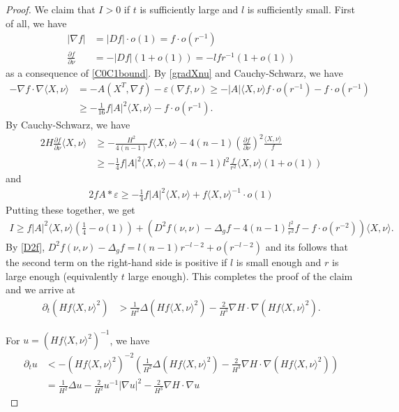 \documentclass[10pt,a4paper]{amsart}
\newcommand{\lt}{\left}
\newcommand{\na}{\nabla}
\newcommand{\pl}{\partial}
\newcommand{\rt}{\right}
\begin{document}
\begin{proof}
We claim that $I > 0$ if $t$ is sufficiently large and $l$ is sufficiently small. First of all, we have 
\begin{align*}
|\na f| &= |Df| \cdot o(1) = f \cdot o(r^{-1}) \\
\frac{\pl f}{\pl\nu} &= - |Df| (1 + o(1)) = - lf r^{-1} (1 + o(1))
\end{align*}
as a consequence of \eqref{C0C1bound}.
By \eqref{gradXnu} and Cauchy-Schwarz, we have
\begin{align*}
- \na f \cdot \na \langle X,\nu \rangle &= - A(X^T,\na f) - \varepsilon (\na f,\nu) \ge  - |A|\langle X,\nu \rangle f \cdot o(r^{-1}) - f \cdot o(r^{-1}) \\
&\ge -\frac{1}{16} f |A|^2 \langle X,\nu \rangle  - f \cdot o(r^{-1}).
\end{align*}
By Cauchy-Schwarz, we have
\begin{align*}
2H \frac{\pl f}{\pl\nu} \langle X,\nu \rangle &\ge - \frac{H^2}{4(n-1)} f \langle X,\nu \rangle - 4(n-1) \lt( \frac{\pl f}{\pl\nu}\rt)^2 \frac{\langle X,\nu \rangle}{f} \\
&\ge - \frac{1}{4} f |A|^2 \langle X,\nu \rangle - 4(n-1)l^2 \frac{f}{r^2} \langle X,\nu \rangle (1 + o(1))
\end{align*}
and
\begin{align*}
2f A * \varepsilon \ge - \frac{1}{4}f |A|^2 \langle X,\nu \rangle + f \langle X,\nu \rangle^{-1} \cdot o(1)
\end{align*}
Putting these together, we get
\begin{align*}
I \ge f|A|^2 \langle X,\nu \rangle \lt( \frac{1}{4} - o(1) \rt) + \lt( D^2 f(\nu,\nu) - \Delta_g f - 4(n-1) \frac{l^2}{r^2} f - f \cdot o(r^{-2}) \rt)\langle X,\nu \rangle.
\end{align*}
By \eqref{D2f}, $D^2 f(\nu,\nu) - \Delta_g f = l(n-1) r^{-l-2} + o(r^{-l-2})$ and its follows that the second term on the right-hand side is positive if $l$ is small enough and $r$ is large enough (equivalently $t$ large enough). This completes the proof of the claim and we arrive at
\begin{align*}
\pl_t \lt( Hf\langle X,\nu \rangle^2 \rt) &> \frac{1}{H^2}\Delta (Hf\langle X,\nu \rangle^2) - \frac{2}{H^3} \na H \cdot \na (Hf\langle X,\nu \rangle^2).
\end{align*}

For $u = \lt( Hf\langle X,\nu \rangle^2\rt)^{-1}$, we have
\begin{align*}
\pl_t u &< - (Hf \langle X,\nu \rangle^2)^{-2} \lt( \frac{1}{H^2}\Delta (Hf\langle X,\nu \rangle^2) - \frac{2}{H^3} \na H \cdot \na (Hf\langle X,\nu \rangle^2) \rt) \\
&= \frac{1}{H^2}\Delta u - \frac{2}{H^2} u^{-1} |\na u|^2 - \frac{2}{H^3} \na H \cdot \na u
\end{align*}
\end{proof}
\end{document}
